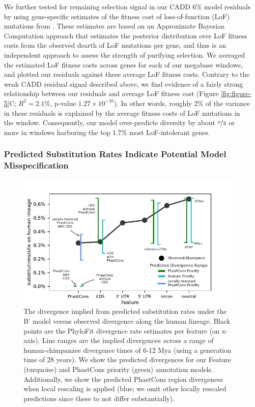 \documentclass[11pt]{article}
\begin{document}
We further tested for remaining selection signal in our CADD 6\% model
residuals by using gene-specific estimates of the fitness cost of
loss-of-function (LoF) mutations from \textcite{Agarwal2023-un}. These
estimates are based on an Approximate Bayesian Computation approach that
estimates the posterior distribution over LoF fitness costs from the observed
dearth of LoF mutations per gene, and thus is an independent
approach to assess the strength of purifying selection. We averaged the estimated LoF fitness costs across genes
for each of our megabase windows, and plotted our residuals against these
average LoF fitness costs. Contrary to the weak CADD residual signal described
above, we find evidence of a fairly strong relationship between our residuals
and average LoF fitness cost (Figure \ref{fig:figure-5}C; $R^2 = 2.1\%$,
p-value $1.27 \times 10^{-10}$). In other words, roughly 2\% of the variance in
these residuals is explained by the average fitness costs of LoF mutations in
the window. Consequently, our model over-predicts diversity by about
$\nicefrac{\sigma}{2}$ or more in windows harboring the top 1.7\% most
LoF-intolerant genes.

\subsubsection*{Predicted Substitution Rates Indicate Potential Model Misspecification}

\begin{figure}[htbp] \centering
    \includegraphics[width=\textwidth]{figures/figure_7.pdf} 

    \caption{The divergence implied from predicted substitution rates under the B' model versus observed divergence along the human lineage.
        Black points are the PhyloFit divergence rate estimates per feature
        (on x-axis). Line ranges are the implied divergences across a range of
        human-chimpanzee divergence times of 6-12 Mya (using a generation time of
        28 years). We show the predicted divergences for our Feature
        (turquoise) and PhastCons priority (green) annotation models.
        Additionally, we show the predicted PhastCons region divergences when
    local rescaling is applied (blue; we omit other locally rescaled predictions
since these to not differ substantially).}

  \label{fig:figure-7}
\end{figure}
\end{document}
